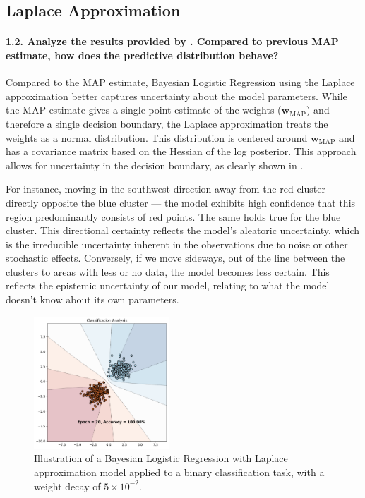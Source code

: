 \subsection{Laplace Approximation}
\paragraph{1.2. Analyze the results provided by . Compared to previous MAP estimate, how does the predictive distribution behave?}

Compared to the MAP estimate, Bayesian Logistic Regression using the Laplace approximation better captures uncertainty about the model parameters. While the MAP estimate gives a single point estimate of the weights ($\mathbf{w}_{\textrm{MAP}}$) and therefore a single decision boundary, the Laplace approximation treats the weights as a normal distribution. This distribution is centered around $\mathbf{w}_{\textrm{MAP}}$ and has a covariance matrix based on the Hessian of the log posterior. This approach allows for uncertainty in the decision boundary, as clearly shown in .

For instance, moving in the southwest direction away from the red cluster — directly opposite the blue cluster — the model exhibits high confidence that this region predominantly consists of red points. The same holds true for the blue cluster. This directional certainty reflects the model's aleatoric uncertainty, which is the irreducible uncertainty inherent in the observations due to noise or other stochastic effects. Conversely, if we move sideways, out of the line between the clusters to areas with less or no data, the model becomes less certain. This reflects the epistemic uncertainty of our model, relating to what the model doesn't know about its own parameters.

\begin{figure}[H]
    \centering
    \includegraphics[width=0.45\textwidth]{laplace_approx.pdf}
    \caption{Illustration of a Bayesian Logistic Regression with Laplace approximation model applied to a binary classification task, with a weight decay of $5 \times 10^{-2}$.}
    \label{fig:laplace_approx}
\end{figure}


